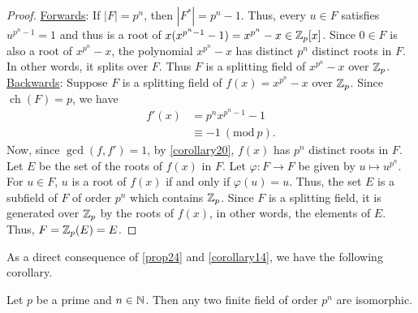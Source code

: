 \documentclass[11pt]{article}
\newcommand{\Mod}[1]{\ (\mathrm{mod}\ #1)}
\DeclareMathOperator{\ch}{ch}
\begin{document}
\begin{proof}
\underline{Forwards}: If $|F| = p^n$, then $|F^*|= p^n - 1$. Thus, every $u \in
F$ satisfies $u^{p^n-1} = 1$ and thus is a root of $x(x^{p^n-1} - 1) =
x^{p^n} - x \in \mathbb{Z}_p[x]$. Since $0 \in F$ is also a root of $x^{p^n} - x$, the
polynomial $x^{p^n} - x$ has distinct $p^n$ distinct roots in $F$. In other
words, it splits over $F$. Thus $F$ is a splitting field of $x^{p^n} - x$ over
$\mathbb{Z}_p$.\\
\underline{Backwards}: Suppose $F$ is a splitting field of $f(x) = x^{p^n} - x$
over $\mathbb{Z}_p$. Since $\ch(F) = p$, we have
\begin{align*}
f'(x) &= p^nx^{p^n-1} - 1\\
&\equiv -1 \Mod{p}.
\end{align*}
Now, since $\gcd(f,f') = 1$, by \cref{corollary20}, $f(x)$ has $p^n$ distinct
roots in $F$. Let $E$ be the set of the roots of $f(x)$ in $F$. Let $\varphi:F \to
F$ be given by $u \mapsto u^{p^n}$. For $u \in F$, $u$ is a root of $f(x)$ if
and only if $\varphi(u) = u$. Thus, the set $E$ is a subfield of $F$ of order $p^n$
which contains $\mathbb{Z}_p$. Since $F$ is a splitting field, it is generated over
$\mathbb{Z}_p$ by the roots of $f(x)$, in other words, the elements of $E$. Thus,
$F = \mathbb{Z}_p(E) = E$.
\end{proof}
As a direct consequence of \cref{prop24} and \cref{corollary14}, we have the
following corollary.
\begin{corollary}[E. H. Moore]
Let $p$ be a prime and $n \in \mathbb{N}$. Then any two finite field of order $p^n$ are
isomorphic.
\label{corollary25}
\end{corollary}
\end{document}

